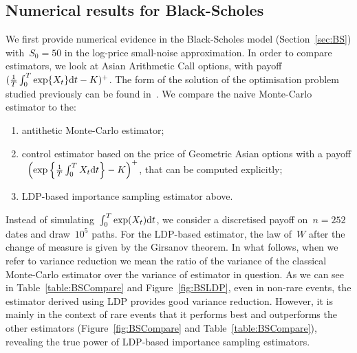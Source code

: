 \subsection{Numerical results for Black-Scholes}\label{sec:BS_numerical_results}
We first provide numerical evidence in the Black-Scholes model (Section~\ref{sec:BS}) with~$S_0=50$ in the log-price small-noise approximation.
In order to compare estimators, we look at Asian Arithmetic Call options, 
with payoff~$(\frac{1}{T}\int_0^T \exp\{X_t\} \mathrm{d} t - K)^+$. The form of the solution of the optimisation problem studied previously can be found in~\cite{Guasoni2007OptimalTime}. We compare the naive Monte-Carlo estimator to the: 
\begin{enumerate}[-]
    \item antithetic Monte-Carlo estimator;
    \item control estimator based on the price of Geometric Asian options with a payoff
   ~$\left(\exp\left\{\frac{1}{T}\int_0^T X_t \mathrm{d} t\right\} - K\right)^+$,
    that can be computed explicitly;
    \item LDP-based importance sampling estimator above.
\end{enumerate}
Instead of simulating~$\int_0^T \exp(X_t)\mathrm{d} t$, we consider a discretised payoff on~$n=252$ dates and draw~$10^5$ paths.
For the LDP-based estimator, the law of~$W$ after the change of measure is given by the Girsanov theorem.
In what follows, when we refer to variance reduction we mean the ratio of the variance of the classical Monte-Carlo estimator over the variance of estimator in question.
As we can see in Table~\ref{table:BSCompare} and Figure~\ref{fig:BSLDP}, 
even in non-rare events, the estimator derived using LDP provides good variance reduction. 
However, it is mainly in the context of rare events that it performs best and outperforms the other estimators (Figure~\ref{fig:BSCompare} and Table~\ref{table:BSCompare}), 
revealing the true power of LDP-based importance sampling estimators.

